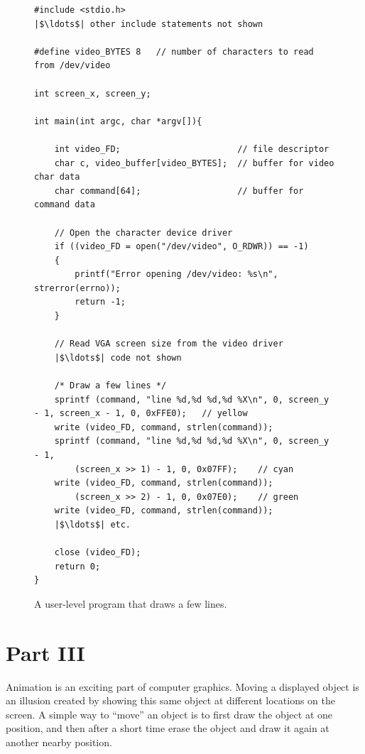 \documentclass[epsfig,10pt,fullpage]{article}
\begin{document}
\lstset{language=C,numbers=none}
\begin{figure}[H]
\begin{center}
\begin{minipage}[t]{15 cm}
\begin{lstlisting}[name=part2]
#include <stdio.h>
|$\ldots$| other include statements not shown

#define video_BYTES 8	// number of characters to read from /dev/video

int screen_x, screen_y;

int main(int argc, char *argv[]){

	int video_FD;						// file descriptor
	char c, video_buffer[video_BYTES];	// buffer for video char data
	char command[64];					// buffer for command data
    
	// Open the character device driver
	if ((video_FD = open("/dev/video", O_RDWR)) == -1)
	{
		printf("Error opening /dev/video: %s\n", strerror(errno));
		return -1;
	}
	
	// Read VGA screen size from the video driver
	|$\ldots$| code not shown

	/* Draw a few lines */
	sprintf (command, "line %d,%d %d,%d %X\n", 0, screen_y - 1, screen_x - 1, 0, 0xFFE0);	// yellow
	write (video_FD, command, strlen(command));
	sprintf (command, "line %d,%d %d,%d %X\n", 0, screen_y - 1, 
		(screen_x >> 1) - 1, 0, 0x07FF);	// cyan
	write (video_FD, command, strlen(command));
		(screen_x >> 2) - 1, 0, 0x07E0);	// green
	write (video_FD, command, strlen(command));
	|$\ldots$| etc.

	close (video_FD);
	return 0;
}
\end{lstlisting}
\end{minipage}
\caption{A user-level program that draws a few lines.}
\label{fig:part2}
\end{center}
\end{figure}

\pagebreak

\noindent
\section*{Part III}

\noindent
Animation is an exciting part of computer graphics. Moving a displayed object is an illusion 
created by showing this same object at different locations on the screen. A simple way to
``move'' an object is to first draw the object at one position, and then after a short time erase 
the object and draw it again at another nearby position.
\end{document}
